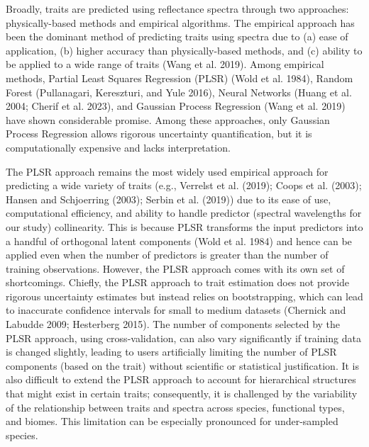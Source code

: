 \documentclass[
  letterpaper,
  DIV=11,
  numbers=noendperiod]{scrartcl}
\begin{document}
Broadly, traits are predicted using reflectance spectra through two
approaches: physically-based methods and empirical algorithms. The
empirical approach has been the dominant method of predicting traits
using spectra due to (a) ease of application, (b) higher accuracy than
physically-based methods, and (c) ability to be applied to a wide range
of traits (Wang et al. 2019). Among empirical methods, Partial Least
Squares Regression (PLSR) (Wold et al. 1984), Random Forest
(Pullanagari, Kereszturi, and Yule 2016), Neural Networks (Huang et al.
2004; Cherif et al. 2023), and Gaussian Process Regression (Wang et al.
2019) have shown considerable promise. Among these approaches, only
Gaussian Process Regression allows rigorous uncertainty quantification,
but it is computationally expensive and lacks interpretation.

The PLSR approach remains the most widely used empirical approach for
predicting a wide variety of traits (e.g., Verrelst et al. (2019); Coops
et al. (2003); Hansen and Schjoerring (2003); Serbin et al. (2019)) due
to its ease of use, computational efficiency, and ability to handle
predictor (spectral wavelengths for our study) collinearity. This is
because PLSR transforms the input predictors into a handful of
orthogonal latent components (Wold et al. 1984) and hence can be applied
even when the number of predictors is greater than the number of
training observations. However, the PLSR approach comes with its own set
of shortcomings. Chiefly, the PLSR approach to trait estimation does not
provide rigorous uncertainty estimates but instead relies on
bootstrapping, which can lead to inaccurate confidence intervals for
small to medium datasets (Chernick and Labudde 2009; Hesterberg 2015).
The number of components selected by the PLSR approach, using
cross-validation, can also vary significantly if training data is
changed slightly, leading to users artificially limiting the number of
PLSR components (based on the trait) without scientific or statistical
justification. It is also difficult to extend the PLSR approach to
account for hierarchical structures that might exist in certain traits;
consequently, it is challenged by the variability of the relationship
between traits and spectra across species, functional types, and biomes.
This limitation can be especially pronounced for under-sampled species.
\end{document}
